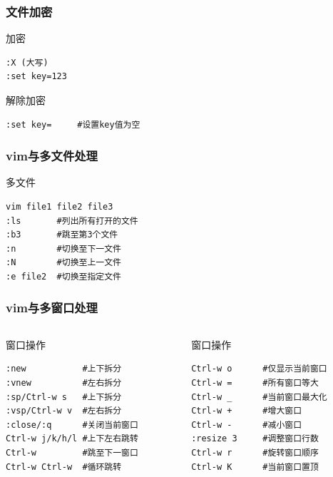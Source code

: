 \documentclass[xcolor=svgnames,presentation]{beamer}
\begin{document}
\begin{frame}[fragile]
\frametitle{文件加密}
\label{sec-4-6-7}
\begin{exampleblock}{加密}
\label{sec-4-6-7-1}


\begin{verbatim}
:X (大写)
:set key=123
\end{verbatim}
\end{exampleblock}
\begin{block}{解除加密}
\label{sec-4-6-7-2}


\begin{verbatim}
:set key=     #设置key值为空
\end{verbatim}
\end{block}
\end{frame}
\begin{frame}[fragile]
\frametitle{vim与多文件处理}
\label{sec-4-6-8}
\begin{exampleblock}{多文件}
\label{sec-4-6-8-1}


\begin{verbatim}
vim file1 file2 file3
:ls       #列出所有打开的文件
:b3       #跳至第3个文件
:n        #切换至下一文件
:N        #切换至上一文件
:e file2  #切换至指定文件
\end{verbatim}
\end{exampleblock}
\end{frame}
\begin{frame}[fragile]
\frametitle{vim与多窗口处理}
\label{sec-4-6-9}
\begin{columns}
\begin{column}{0.5\textwidth}
\begin{exampleblock}{窗口操作}
\label{sec-4-6-9-1}


\begin{verbatim}
:new           #上下拆分
:vnew          #左右拆分
:sp/Ctrl-w s   #上下拆分
:vsp/Ctrl-w v  #左右拆分
:close/:q      #关闭当前窗口
Ctrl-w j/k/h/l #上下左右跳转
Ctrl-w         #跳至下一窗口
Ctrl-w Ctrl-w  #循环跳转
\end{verbatim}
\end{exampleblock}
\end{column}
\begin{column}{0.5\textwidth}
\begin{block}{窗口操作}
\label{sec-4-6-9-2}


\begin{verbatim}
Ctrl-w o      #仅显示当前窗口
Ctrl-w =      #所有窗口等大
Ctrl-w _      #当前窗口最大化
Ctrl-w +      #增大窗口
Ctrl-w -      #减小窗口
:resize 3     #调整窗口行数
Ctrl-w r      #旋转窗口顺序
Ctrl-w K      #当前窗口置顶
\end{verbatim}
\end{block}
\end{column}
\end{columns}
\end{frame}
\end{document}
